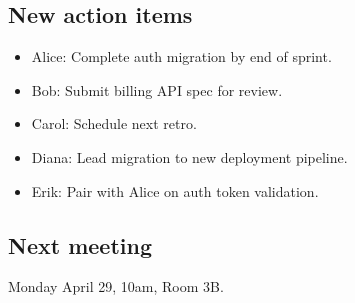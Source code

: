 \documentclass{article}
\begin{document}
\subsection*{New action items}
\begin{itemize}[noitemsep]
  \item Alice: Complete auth migration by end of sprint.
  \item Bob: Submit billing API spec for review.
  \item Carol: Schedule next retro.
  \item Diana: Lead migration to new deployment pipeline.
  \item Erik: Pair with Alice on auth token validation.
\end{itemize}

\subsection*{Next meeting}
Monday April 29, 10am, Room 3B.
\end{document}
